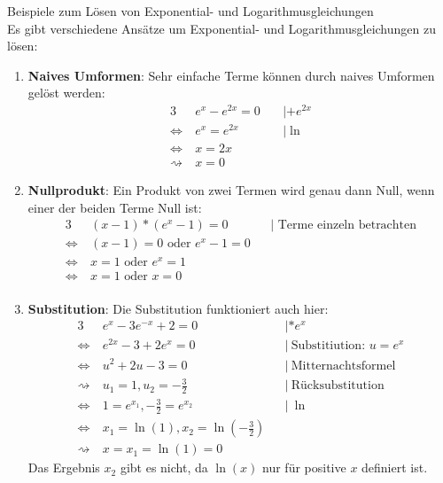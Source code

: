 \begin{bla}{Beispiele zum Lösen von Exponential- und Logarithmusgleichungen} \  \\
  Es gibt verschiedene Ansätze um Exponential- und Logarithmusgleichungen zu lösen:
  \begin{enumerate}
    \item \textbf{Naives Umformen}: Sehr einfache Terme können durch naives Umformen gelöst werden:
      \begin{alignat*}{3}
        & e^x-e^{2x}=0\  && |+e^{2x} \\
        \Leftrightarrow\  & e^x=e^{2x} && |\ln \\
        \Leftrightarrow\  & x=2x && \\
        \rightsquigarrow & x=0 &&
      \end{alignat*}
    \item \textbf{Nullprodukt}: Ein Produkt von zwei Termen wird genau dann Null, wenn einer der beiden Terme Null ist:
      \begin{alignat*}{3}
        & (x-1)*(e^x-1)=0 && | \text{\ Terme einzeln betrachten} \\
        \Leftrightarrow\  & (x-1)=0 \text{\ oder\ } e^x-1=0 && \\
        \Leftrightarrow\  & x=1 \text{\ oder\ } e^x=1 && \\
        \Leftrightarrow\ & x=1 \text{\ oder\ } x=0 && \\
      \end{alignat*}
    \item \textbf{Substitution}: Die Substitution funktioniert auch hier:
      \begin{alignat*}{3}
        & e^x-3e^{-x}+2=0 && | *e^x\\
        \Leftrightarrow\  & e^{2x}-3+2e^x=0 && |\  \text{Substitiution:\ } u=e^x \\
        \Leftrightarrow\  & u^2+2u-3=0 && |\  \text{Mitternachtsformel} \\
        \rightsquigarrow\  & u_1=1, u_2=-\frac{3}{2} && |\ \text{Rücksubstitution} \\
        \Leftrightarrow\ & 1=e^{x_1}, -\frac{3}{2}=e^{x_2} && |\ \ln \\
        \Leftrightarrow\ & x_1=\ln(1), x_2=\ln(-\frac{3}{2}) \\
        \rightsquigarrow\ & x=x_1=\ln(1)=0 &&
      \end{alignat*}
      Das Ergebnis $x_2$ gibt es nicht, da $\ln(x)$ nur für positive $x$ definiert ist.
  \end{enumerate}
\end{bla}
